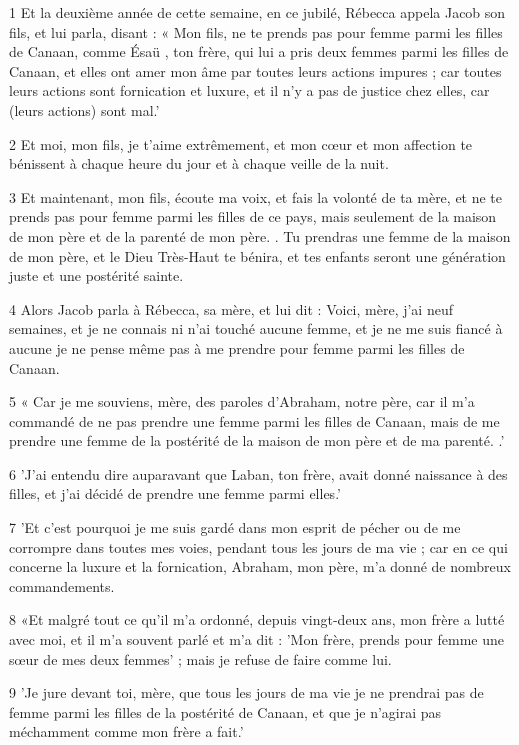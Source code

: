 \par 1 Et la deuxième année de cette semaine, en ce jubilé, Rébecca appela Jacob son fils, et lui parla, disant : « Mon fils, ne te prends pas pour femme parmi les filles de Canaan, comme Ésaü , ton frère, qui lui a pris deux femmes parmi les filles de Canaan, et elles ont amer mon âme par toutes leurs actions impures ; car toutes leurs actions sont fornication et luxure, et il n'y a pas de justice chez elles, car (leurs actions) sont mal.'
\par 2 Et moi, mon fils, je t'aime extrêmement, et mon cœur et mon affection te bénissent à chaque heure du jour et à chaque veille de la nuit.
\par 3 Et maintenant, mon fils, écoute ma voix, et fais la volonté de ta mère, et ne te prends pas pour femme parmi les filles de ce pays, mais seulement de la maison de mon père et de la parenté de mon père. . Tu prendras une femme de la maison de mon père, et le Dieu Très-Haut te bénira, et tes enfants seront une génération juste et une postérité sainte.
\par 4 Alors Jacob parla à Rébecca, sa mère, et lui dit : Voici, mère, j'ai neuf semaines, et je ne connais ni n'ai touché aucune femme, et je ne me suis fiancé à aucune je ne pense même pas à me prendre pour femme parmi les filles de Canaan.
\par 5 « Car je me souviens, mère, des paroles d'Abraham, notre père, car il m'a commandé de ne pas prendre une femme parmi les filles de Canaan, mais de me prendre une femme de la postérité de la maison de mon père et de ma parenté. .'
\par 6 'J'ai entendu dire auparavant que Laban, ton frère, avait donné naissance à des filles, et j'ai décidé de prendre une femme parmi elles.'
\par 7 'Et c'est pourquoi je me suis gardé dans mon esprit de pécher ou de me corrompre dans toutes mes voies, pendant tous les jours de ma vie ; car en ce qui concerne la luxure et la fornication, Abraham, mon père, m'a donné de nombreux commandements.
\par 8 «Et malgré tout ce qu'il m'a ordonné, depuis vingt-deux ans, mon frère a lutté avec moi, et il m'a souvent parlé et m'a dit : 'Mon frère, prends pour femme une sœur de mes deux femmes' ; mais je refuse de faire comme lui.
\par 9 'Je jure devant toi, mère, que tous les jours de ma vie je ne prendrai pas de femme parmi les filles de la postérité de Canaan, et que je n'agirai pas méchamment comme mon frère a fait.'
